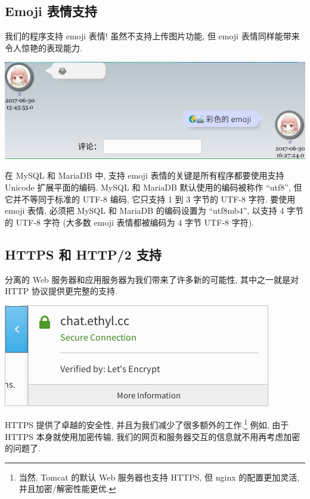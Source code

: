 \documentclass[a4paper,10pt]{article}
\begin{document}
\subsection{Emoji 表情支持}

我们的程序支持 emoji 表情! 虽然不支持上传图片功能, 但 emoji 表情同样能带来令人惊艳的表现能力.

\begin{center}
	\includegraphics[scale=0.6]{emoji.png}
\end{center}

在 MySQL 和 MariaDB 中, 支持 emoji 表情的关键是所有程序都要使用支持 Unicode 扩展平面的编码. MySQL 和 MariaDB 默认使用的编码被称作 ``utf8'', 但它并不等同于标准的 UTF-8 编码, 它只支持 1 到 3 字节的 UTF-8 字符. 要使用 emoji 表情, 必须把 MySQL 和 MariaDB 的编码设置为 ``utf8mb4'', 以支持 4 字节的 UTF-8 字符 (大多数 emoji 表情都被编码为 4 字节 UTF-8 字符).

\subsection{HTTPS 和 HTTP/2 支持}

分离的 Web 服务器和应用服务器为我们带来了许多新的可能性, 其中之一就是对 HTTP 协议提供更完整的支持.

\begin{center}
	\includegraphics[scale=0.6]{https.png}
\end{center}

HTTPS 提供了卓越的安全性, 并且为我们减少了很多额外的工作.\footnote{当然, Tomcat 的默认 Web 服务器也支持 HTTPS, 但 nginx 的配置更加灵活, 并且加密/解密性能更优.} 例如, 由于 HTTPS 本身就使用加密传输, 我们的网页和服务器交互的信息就不用再考虑加密的问题了.
\end{document}
